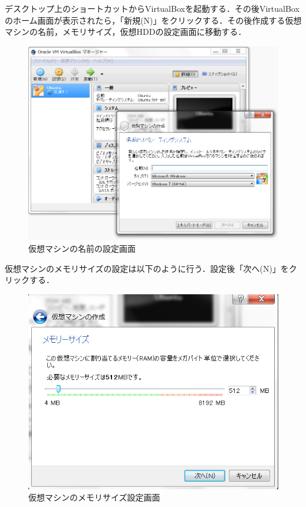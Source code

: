 デスクトップ上のショートカットからVirtualBoxを起動する．その後VirtualBoxのホーム画面が表示されたら，「新規(N)」をクリックする．その後作成する仮想マシンの名前，メモリサイズ，仮想HDDの設定画面に移動する．

\begin{figure}[H]
\centering
\includegraphics[width=15cm]{vb001.png}
\caption{仮想マシンの名前の設定画面}\label{仮想マシンの設定画面}
\end{figure}

仮想マシンのメモリサイズの設定は以下のように行う．設定後「次へ(N)」をクリックする．

\begin{figure}[H]
\centering
\includegraphics[width=15cm]{vb002.png}
\caption{仮想マシンのメモリサイズ設定画面}\label{仮想マシンの設定画面}
\end{figure}

